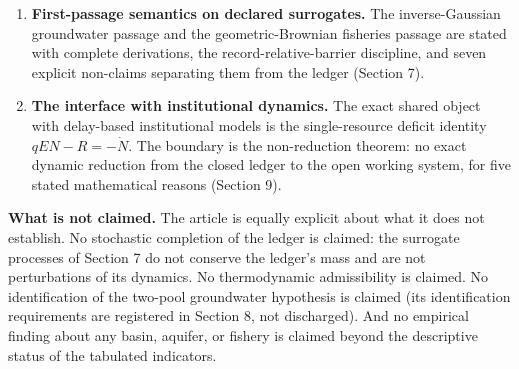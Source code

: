 \documentclass[11pt]{article}
\begin{document}
\begin{enumerate}
  the published critiques they corroborate (Section 6.5).
\item
  \textbf{First-passage semantics on declared surrogates.} The
  inverse-Gaussian groundwater passage and the geometric-Brownian
  fisheries passage are stated with complete derivations, the
  record-relative-barrier discipline, and seven explicit non-claims
  separating them from the ledger (Section 7).
\item
  \textbf{The interface with institutional dynamics.} The exact shared
  object with delay-based institutional models is the single-resource
  deficit identity \(qEN - R = -\dot N\). The boundary is the
  non-reduction theorem: no exact dynamic reduction from the closed
  ledger to the open working system, for five stated mathematical
  reasons (Section 9).
\end{enumerate}

\textbf{What is not claimed.} The article is equally explicit about what
it does not establish. No stochastic completion of the ledger is
claimed: the surrogate processes of Section 7 do not conserve the
ledger's mass and are not perturbations of its dynamics. No
thermodynamic admissibility is claimed. No identification of the
two-pool groundwater hypothesis is claimed (its identification
requirements are registered in Section 8, not discharged). And no
empirical finding about any basin, aquifer, or fishery is claimed beyond
the descriptive status of the tabulated indicators.
\end{document}
